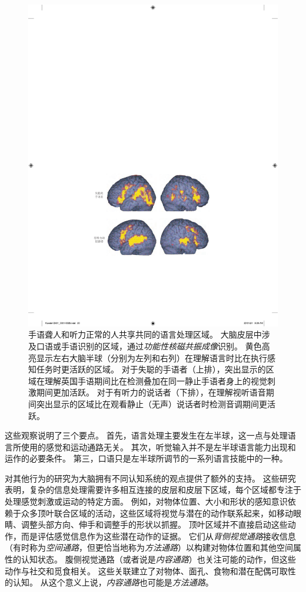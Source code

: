 \begin{figure}[htbp]
	\centering
	\includegraphics[width=0.82\linewidth]{chap01/fig_1_8}
	\caption{手语聋人和听力正常的人共享共同的语言处理区域。
		大脑皮层中涉及口语或手语识别的区域，通过\textit{功能性核磁共振成像}识别。
		黄色高亮显示左右大脑半球（分别为左列和右列）在理解语言时比在执行感知任务时更活跃的区域。
		对于失聪的手语者（上排），突出显示的区域在理解英国手语期间比在检测叠加在同一静止手语者身上的视觉刺激期间更加活跃。
		对于有听力的说话者（下排），在理解视听语音期间突出显示的区域比在观看静止（无声）说话者时检测音调期间更活跃\cite{macsweeney2002neural}。}
	\label{fig:1_8}
\end{figure}


这些观察说明了三个要点。
首先，语言处理主要发生在左半球，这一点与处理语言所使用的感觉和运动通路无关。
其次，听觉输入并不是左半球语言能力出现和运作的必要条件。
第三，口语只是左半球所调节的一系列语言技能中的一种。



对其他行为的研究为大脑拥有不同认知系统的观点提供了额外的支持。
这些研究表明，复杂的信息处理需要许多相互连接的皮层和皮层下区域，每个区域都专注于处理感觉刺激或运动的特定方面。
例如，对物体位置、大小和形状的感知意识依赖于众多顶叶联合区域的活动，这些区域将视觉与潜在的动作联系起来，如移动眼睛、调整头部方向、伸手和调整手的形状以抓握。
顶叶区域并不直接启动这些动作，而是评估感觉信息作为这些潜在动作的证据。
它们从\textit{背侧视觉通路}接收信息（有时称为\textit{空间通路}，但更恰当地称为\textit{方法通路}）以构建对物体位置和其他空间属性的认知状态。
腹侧视觉通路（或者说是\textit{内容通路}）也关注可能的动作，但这些动作与社交和觅食相关。
这些关联建立了对物体、面孔、食物和潜在配偶可取性的认知。
从这个意义上说，\textit{内容通路}也可能是\textit{方法通路}。



